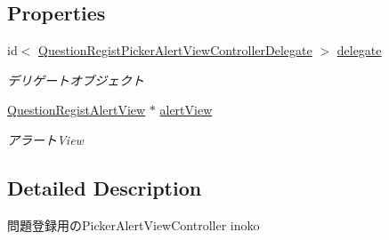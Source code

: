 \subsection*{Properties}
\begin{DoxyCompactItemize}
\item 
\hypertarget{interface_question_regist_picker_alert_view_controller_a78ad86809b24919a0668a3910d9d9e33}{
id$<$ \hyperlink{protocol_question_regist_picker_alert_view_controller_delegate-p}{QuestionRegistPickerAlertViewControllerDelegate} $>$ \hyperlink{interface_question_regist_picker_alert_view_controller_a78ad86809b24919a0668a3910d9d9e33}{delegate}}
\label{interface_question_regist_picker_alert_view_controller_a78ad86809b24919a0668a3910d9d9e33}

\begin{DoxyCompactList}\small\item\em デリゲートオブジェクト \end{DoxyCompactList}\item 
\hypertarget{interface_question_regist_picker_alert_view_controller_a99b31f2bf632c7eb36b64cf6c573f3f7}{
\hyperlink{interface_question_regist_alert_view}{QuestionRegistAlertView} $\ast$ \hyperlink{interface_question_regist_picker_alert_view_controller_a99b31f2bf632c7eb36b64cf6c573f3f7}{alertView}}
\label{interface_question_regist_picker_alert_view_controller_a99b31f2bf632c7eb36b64cf6c573f3f7}

\begin{DoxyCompactList}\small\item\em アラートView \end{DoxyCompactList}\end{DoxyCompactItemize}


\subsection{Detailed Description}
問題登録用のPickerAlertViewController  inoko 

